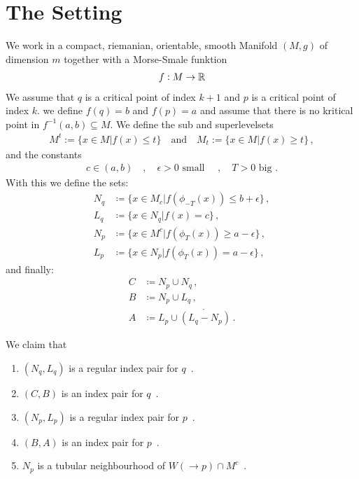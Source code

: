 \pagestyle{empty}

\section*{The Setting}
We work in a compact, riemanian, orientable, smooth Manifold $(M,g)$ of dimension $m$ together with a Morse-Smale funktion 
\begin{align}
    f: M\to \mathbb{R}
\end{align}
We assume that $q$ is a critical point of index $k+1$ and $p$ is a critical point of index $k$. we define $f(q)=b$ and $f(p)=a$ and assume that there is no kritical point in $f^{-1}(a,b)\subseteq M$. We define the sub and superlevelsets 
\begin{align}
    M^t:=\{ x\in M | f(x)\leq t \} \quad \text{and}\quad M_t:=\{ x\in M | f(x)\geq t \} \, ,
\end{align} and the constants 
\begin{align}
    c \in (a,b) \quad , \quad \epsilon >0 \text{ small } \quad,\quad T>0 \text{ big .}
\end{align} With this we define the sets: 
\begin{align}
	N_q  & \coloneq    \{ x\in M_c |f(\phi_{-T}(x))  \leq b+ \epsilon  \}   \, ,  \\
	L_q  & \coloneq    \{ x\in N_q |f(x)             =    c            \}    \, , \\
	N_p  & \coloneq    \{ x\in M^c |f(\phi_T(x))     \geq a-\epsilon   \}    \, , \\
	L_p  & \coloneq    \{ x\in N_p |f( \phi_T(x))    =    a-\epsilon   \} \, ,
\end{align} and finally: 
\begin{align}
	C  & \coloneq  N_p \cup N_q  \, ,                     \\
	B  & \coloneq  N_p \cup L_q   \, ,                   \\
	A  & \coloneq  L_p \cup \mathring{(L_q-N_p)} \, .
\end{align}
\begin{lemma}
    We claim that 
    \begin{enumerate}
	\item $(N_q,L_q)$ is a regular index pair for $q$\, . \label{lem: enum: 1}
	\item $(C,B)$ is an index pair for $q$\, .\label{lem: enum: 2}
	\item $(N_p,L_p)$ is a regular index pair for $p$\, .\label{lem: enum: 3}
	\item $(B,A)$ is an index pair for $p$\, .\label{lem: enum: 4}
    \item $N_p$ is a tubular neighbourhood of $W(\to p)\cap M^c$\, .\label{lem: enum: 5}
\end{enumerate}
\end{lemma}

